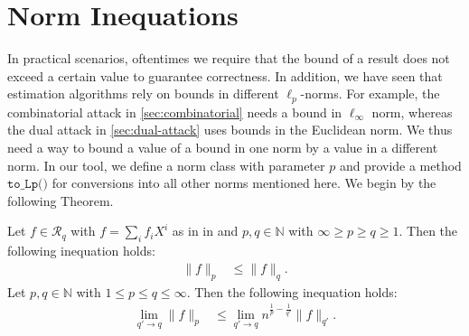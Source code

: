 \section{Norm Inequations} \label{sec:norm-bounds}%
In practical scenarios, oftentimes we require that the bound of a result does not exceed a certain value to guarantee correctness. In addition, we have seen that estimation algorithms rely on bounds in different $\ell_p$-norms. For example, the combinatorial attack in \cref{sec:combinatorial} needs a bound in $\ell_\infty$ norm, whereas the dual attack in \cref{sec:dual-attack} uses bounds in the Euclidean norm. We thus need a way to bound a value of a bound in one norm by a value in a different norm. In our tool, we define a norm class with parameter $p$ and provide a  method $\texttt{to\_Lp()}$ for conversions into all other norms mentioned here. We begin by the following Theorem.
\begin{theorem}\label{th:norm-rel1}
    Let $f \in \mathcal{R}_q$ with $f = \sum_i f_i X^i$ as in in \cite{BDLOP18} and $p, q \in \mathbb{N}$ with $\infty \geq p \geq q \geq 1$. Then the following inequation holds:
    \begin{align}
        \| f \|_p & \leq \| f \|_q \label{eq:norm-inf-leq-1}.
    \end{align}
    Let $p, q \in \mathbb{N}$ with $1 \leq p \leq q \leq \infty$. Then the following inequation holds:
    \begin{align}
        \lim_{q' \rightarrow q}\| f \|_p & \leq \lim_{q' \rightarrow q} n^{\frac{1}{p} - \frac{1}{q'}}\| f \|_{q'} \label{eq:norm-1-leq-inf}.
    \end{align}
\end{theorem}

